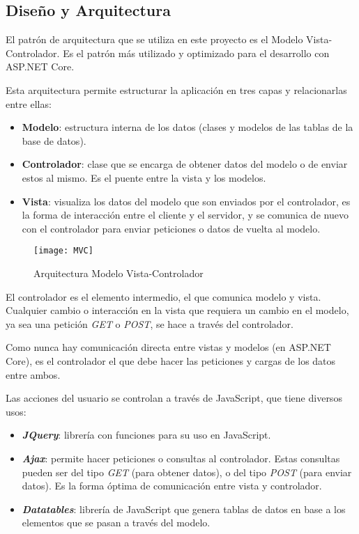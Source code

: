 \subsection{Diseño y Arquitectura}
El patrón de arquitectura que se utiliza en este proyecto es el Modelo Vista-Controlador. Es el patrón más utilizado y optimizado para el desarrollo con ASP.NET Core.

Esta arquitectura permite estructurar la aplicación en tres capas y relacionarlas entre ellas:
\begin{itemize}
 \item \textbf{Modelo}: estructura interna de los datos (clases y modelos de las tablas de la base de datos).
 \item \textbf{Controlador}: clase que se encarga de obtener datos del modelo o de enviar estos al mismo. Es el puente entre la vista y los modelos.
 \item \textbf{Vista}: visualiza los datos del modelo que son enviados por el controlador, es la forma de interacción entre el cliente y el servidor, y se comunica de nuevo con el controlador para enviar peticiones o datos de vuelta al modelo. 
\end{itemize}
\begin{figure}
    \centering
    \texttt{[image: MVC]}
    \caption{Arquitectura Modelo Vista-Controlador}
\end{figure}

El controlador es el elemento intermedio, el que comunica modelo y vista. Cualquier cambio
o interacción en la vista que requiera un cambio en el modelo, ya sea una petición \emph{GET}
o \emph{POST}, se hace a través del controlador.

Como nunca hay comunicación directa entre vistas y modelos (en ASP.NET Core), es el controlador
el que debe hacer las peticiones y cargas de los datos entre ambos.

Las acciones del usuario se controlan a través de JavaScript, que tiene diversos usos:
\begin{itemize}
 \item \textbf{\emph{JQuery}}: librería con funciones para su uso en JavaScript.
 \item \textbf{\emph{Ajax}}: permite hacer peticiones o consultas al controlador. Estas consultas pueden ser del tipo \emph{GET} (para obtener datos), o del tipo \emph{POST} (para enviar datos). Es la forma óptima de comunicación entre vista y controlador.
 \item \textbf{\emph{Datatables}}: librería de JavaScript que genera tablas de datos en base a
 los elementos que se pasan a través del modelo.
\end{itemize}

